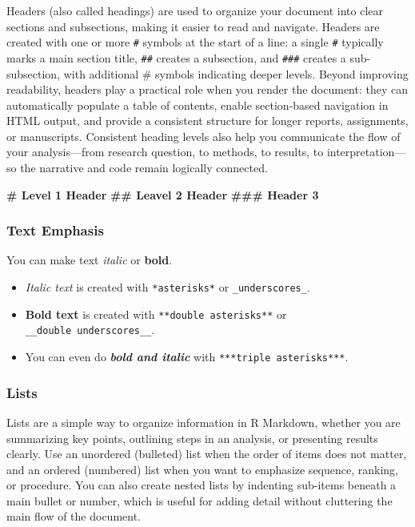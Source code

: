 \documentclass[
  11pt,
]{article}
\newenvironment{Shaded}{\begin{snugshade}}{\end{snugshade}}
\newcommand{\FunctionTok}[1]{\textcolor[rgb]{0.13,0.29,0.53}{\textbf{#1}}}
\providecommand{\tightlist}{%
  \setlength{\itemsep}{0pt}\setlength{\parskip}{0pt}}
\begin{document}
Headers (also called headings) are used to organize your document into
clear sections and subsections, making it easier to read and navigate.
Headers are created with one or more \texttt{\#} symbols at the start of
a line: a single \texttt{\#} typically marks a main section title,
\texttt{\#\#} creates a subsection, and \texttt{\#\#\#} creates a
sub-subsection, with additional \# symbols indicating deeper levels.
Beyond improving readability, headers play a practical role when you
render the document: they can automatically populate a table of
contents, enable section-based navigation in HTML output, and provide a
consistent structure for longer reports, assignments, or manuscripts.
Consistent heading levels also help you communicate the flow of your
analysis---from research question, to methods, to results, to
interpretation---so the narrative and code remain logically connected.

\begin{Shaded}
\begin{Highlighting}[]
\FunctionTok{\#   Level 1 Header}
\FunctionTok{\#\#  Leavel 2 Header}
\FunctionTok{\#\#\# Header 3}
\end{Highlighting}
\end{Shaded}

\subsubsection{Text Emphasis}\label{text-emphasis}

You can make text \emph{italic} or \textbf{bold}.

\begin{itemize}
\tightlist
\item
  \emph{Italic text} is created with \texttt{*asterisks*} or
  \texttt{\_underscores\_}.
\item
  \textbf{Bold text} is created with \texttt{**double\ asterisks**} or
  \texttt{\_\_double\ underscores\_\_}.
\item
  You can even do \textbf{\emph{bold and italic}} with
  \texttt{***triple\ asterisks***}.
\end{itemize}

\subsubsection{Lists}\label{lists}

Lists are a simple way to organize information in R Markdown, whether
you are summarizing key points, outlining steps in an analysis, or
presenting results clearly. Use an unordered (bulleted) list when the
order of items does not matter, and an ordered (numbered) list when you
want to emphasize sequence, ranking, or procedure. You can also create
nested lists by indenting sub-items beneath a main bullet or number,
which is useful for adding detail without cluttering the main flow of
the document.
\end{document}
